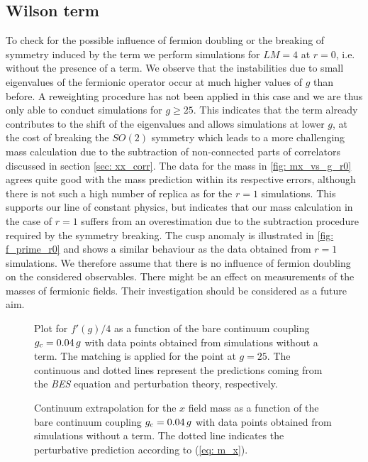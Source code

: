 \subsection*{Wilson term}
To check for the possible influence of fermion doubling or the breaking of symmetry induced by the  term we perform simulations for $LM=4$ at $r=0$, i.e. without the presence of a  term. We observe that the instabilities due to small eigenvalues of the fermionic operator occur at much higher values of $g$ than before. A reweighting procedure has not been applied in this case and we are thus only able to conduct simulations for $g \geq 25$. This indicates that the  term already contributes to the shift of the eigenvalues and allows simulations at lower $g$, at the cost of breaking the $SO(2)$ symmetry which leads to a more challenging mass calculation due to the subtraction of non-connected parts of correlators discussed in section \ref{sec: xx_corr}. The data for the mass in \autoref{fig: mx_vs_g_r0} agrees quite good with the mass prediction within its respective errors, although there is not such a high number of replica as for the $r=1$ simulations. This supports our line of constant physics, but indicates that our mass calculation in the case of $r=1$ suffers from an overestimation due to the subtraction procedure required by the symmetry breaking. The cusp anomaly is illustrated in \autoref{fig: f_prime_r0} and shows a similar behaviour as the data obtained from $r=1$ simulations. We therefore assume that there is no influence of fermion doubling on the considered observables. There might be an effect on measurements of the masses of fermionic fields. Their investigation should be considered as a future aim.
%
%
%
\begin{figure}
\centering

\caption{Plot for $f'(g)/4$ as a function of the bare continuum coupling $g_{\rm c}=0.04\,g$ with data points obtained from simulations without a  term. The matching is applied for the point at $g=25$. The continuous and dotted lines represent the predictions coming from the \textit{BES} equation and perturbation theory, respectively.
\label{fig: f_prime_r0}}
\end{figure}
%
%
%
\begin{figure}
\centering

\caption{Continuum extrapolation for the $x$ field mass as a function of the bare continuum coupling $g_{\rm c}=0.04\,g$ with data points obtained from simulations without a  term. The dotted line indicates the perturbative prediction according to (\ref{eq: m_x}).
\label{fig: mx_vs_g_r0}}
\end{figure}
%
%
%
